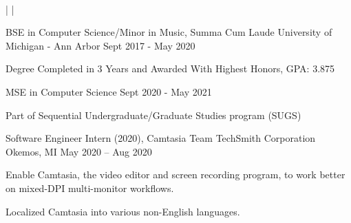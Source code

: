 \documentclass[]{awesome-cv}
\begin{document}
    
\begin{center}
	   \\

	{} | {} | {}
\end{center}
\vspace{-4mm}
\vspace{-2mm}
\cventry
	{BSE in Computer Science/Minor in Music, Summa Cum Laude}
	{University of Michigan - Ann Arbor}
	{}
	{Sept 2017 - May 2020}
	{\begin{cvitems}
		\item{Degree Completed in 3 Years and Awarded With Highest Honors, GPA: 3.875}
		\end{cvitems}}

\vspace{-5mm}
\cventry
	{MSE in Computer Science}
	{}
	{}
	{Sept 2020 - May 2021}
	{\begin{cvitems}
		\item{Part of Sequential Undergraduate/Graduate Studies program (SUGS)}
		\end{cvitems}}


\vspace{-6mm}
\vspace{-2mm}

	\cventry
	{Software Engineer Intern (2020), Camtasia Team}
	{TechSmith Corporation}
	{Okemos, MI}
	{May 2020 – Aug 2020}
	{\begin{cvitems}
		\item {Enable Camtasia, the video editor and screen recording program, to work better on mixed-DPI multi-monitor workflows.}
		\item {Localized Camtasia into various non-English languages.}
	\end{cvitems}}
\end{document}
